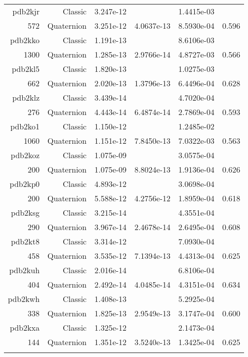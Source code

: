 \begin{xltabular}{\textwidth}{r|rS[table-format=1.3e+2]S[table-format=1.4e+2]S[table-format=1.4e+2]S[table-format=-1.3]}
pdb2kjr & Classic & 3.247e-12 &  & 1.4415e-03 & \\
572 & Quaternion & 3.251e-12 & 4.0637e-13 & 8.5930e-04 & 0.596\\  \addlinespace
{\color{red} pdb2kko } & Classic & 1.191e-13 &  & 8.6106e-03 & \\
1300 & Quaternion & 1.285e-13 & 2.9766e-14 & 4.8727e-03 & 0.566\\  \addlinespace
pdb2kl5 & Classic & 1.820e-13 &  & 1.0275e-03 & \\
662 & Quaternion & 2.020e-13 & 1.3796e-13 & 6.4496e-04 & 0.628\\  \addlinespace
pdb2klz & Classic & 3.439e-14 &  & 4.7020e-04 & \\
276 & Quaternion & 4.443e-14 & 6.4874e-14 & 2.7869e-04 & 0.593\\  \addlinespace
{\color{red} pdb2ko1 } & Classic & 1.150e-12 &  & 1.2485e-02 & \\
1060 & Quaternion & 1.151e-12 & 7.8450e-13 & 7.0322e-03 & 0.563\\  \addlinespace
pdb2koz & Classic & 1.075e-09 &  & 3.0575e-04 & \\
200 & Quaternion & 1.075e-09 & 8.8024e-13 & 1.9136e-04 & 0.626\\  \addlinespace
pdb2kp0 & Classic & 4.893e-12 &  & 3.0698e-04 & \\
200 & Quaternion & 5.588e-12 & 4.2756e-12 & 1.8959e-04 & 0.618\\  \addlinespace
pdb2ksg & Classic & 3.215e-14 &  & 4.3551e-04 & \\
290 & Quaternion & 3.967e-14 & 2.4678e-14 & 2.6495e-04 & 0.608\\  \addlinespace
pdb2kt8 & Classic & 3.314e-12 &  & 7.0930e-04 & \\
458 & Quaternion & 3.535e-12 & 7.1394e-13 & 4.4313e-04 & 0.625\\  \addlinespace
pdb2kuh & Classic & 2.016e-14 &  & 6.8106e-04 & \\
404 & Quaternion & 2.492e-14 & 4.0485e-14 & 4.3151e-04 & 0.634\\  \addlinespace
pdb2kwh & Classic & 1.408e-13 &  & 5.2925e-04 & \\
338 & Quaternion & 1.825e-13 & 2.9549e-13 & 3.1747e-04 & 0.600\\  \addlinespace
pdb2kxa & Classic & 1.325e-12 &  & 2.1473e-04 & \\
144 & Quaternion & 1.351e-12 & 3.5240e-13 & 1.3425e-04 & 0.625\\  \addlinespace

\end{xltabular}
